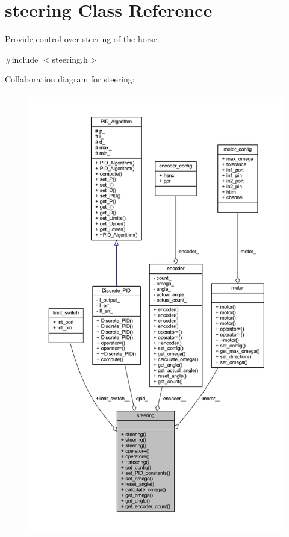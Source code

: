 \hypertarget{classsteering}{}\section{steering Class Reference}
\label{classsteering}


Provide control over steering of the horse.  




{\ttfamily \#include $<$steering.\+h$>$}



Collaboration diagram for steering\+:
\nopagebreak
\begin{figure}[H]
\begin{center}
\leavevmode
\includegraphics[height=550pt]{classsteering__coll__graph}
\end{center}
\end{figure}
